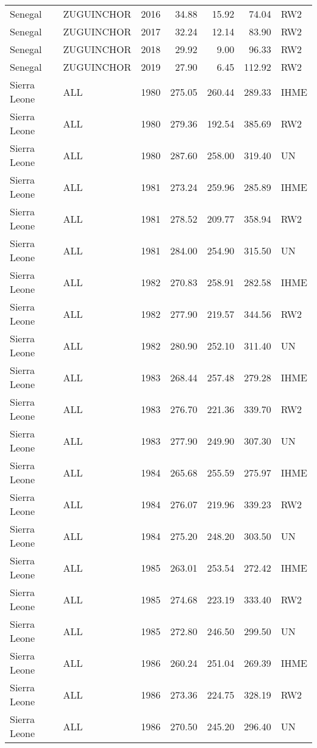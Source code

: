 \begin{longtable}{lllrrrl}
  Senegal & ZUGUINCHOR & 2016 & 34.88 & 15.92 & 74.04 & RW2 \\ 
  Senegal & ZUGUINCHOR & 2017 & 32.24 & 12.14 & 83.90 & RW2 \\ 
  Senegal & ZUGUINCHOR & 2018 & 29.92 & 9.00 & 96.33 & RW2 \\ 
  Senegal & ZUGUINCHOR & 2019 & 27.90 & 6.45 & 112.92 & RW2 \\ 
  Sierra Leone & ALL & 1980 & 275.05 & 260.44 & 289.33 & IHME \\ 
  Sierra Leone & ALL & 1980 & 279.36 & 192.54 & 385.69 & RW2 \\ 
  Sierra Leone & ALL & 1980 & 287.60 & 258.00 & 319.40 & UN \\ 
  Sierra Leone & ALL & 1981 & 273.24 & 259.96 & 285.89 & IHME \\ 
  Sierra Leone & ALL & 1981 & 278.52 & 209.77 & 358.94 & RW2 \\ 
  Sierra Leone & ALL & 1981 & 284.00 & 254.90 & 315.50 & UN \\ 
  Sierra Leone & ALL & 1982 & 270.83 & 258.91 & 282.58 & IHME \\ 
  Sierra Leone & ALL & 1982 & 277.90 & 219.57 & 344.56 & RW2 \\ 
  Sierra Leone & ALL & 1982 & 280.90 & 252.10 & 311.40 & UN \\ 
  Sierra Leone & ALL & 1983 & 268.44 & 257.48 & 279.28 & IHME \\ 
  Sierra Leone & ALL & 1983 & 276.70 & 221.36 & 339.70 & RW2 \\ 
  Sierra Leone & ALL & 1983 & 277.90 & 249.90 & 307.30 & UN \\ 
  Sierra Leone & ALL & 1984 & 265.68 & 255.59 & 275.97 & IHME \\ 
  Sierra Leone & ALL & 1984 & 276.07 & 219.96 & 339.23 & RW2 \\ 
  Sierra Leone & ALL & 1984 & 275.20 & 248.20 & 303.50 & UN \\ 
  Sierra Leone & ALL & 1985 & 263.01 & 253.54 & 272.42 & IHME \\ 
  Sierra Leone & ALL & 1985 & 274.68 & 223.19 & 333.40 & RW2 \\ 
  Sierra Leone & ALL & 1985 & 272.80 & 246.50 & 299.50 & UN \\ 
  Sierra Leone & ALL & 1986 & 260.24 & 251.04 & 269.39 & IHME \\ 
  Sierra Leone & ALL & 1986 & 273.36 & 224.75 & 328.19 & RW2 \\ 
  Sierra Leone & ALL & 1986 & 270.50 & 245.20 & 296.40 & UN \\ 

\end{longtable}
